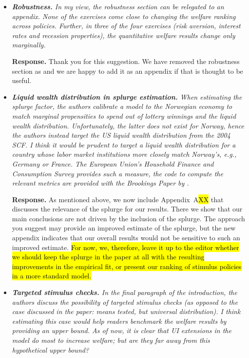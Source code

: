 \documentclass[12pt,letterpaper,english]{article}
\begin{document}
\begin{itemize}
	\item \textit{\textbf{Robustness.} In my view, the robustness section can be relegated to an appendix. None of the exercises come close to changing the welfare ranking across policies. Further, in three of the four exercises
		(risk aversion, interest rates and recession properties), the quantitative welfare results change only marginally.}
	
	\noindent \textbf{Response.} Thank you for this suggestion. We have removed the robustness section as and we are happy to add it as an appendix if that is thought to be useful.
	
	\item \textit{\textbf{Liquid wealth distribution in splurge estimation.} When estimating the splurge factor, the authors calibrate a model to the Norwegian economy to match marginal propensities to spend out of lottery winnings and the liquid wealth distribution. Unfortunately, the latter does not exist for Norway, hence the authors instead target the US liquid wealth distribution from the 2004 SCF. I think it would be prudent to target a liquid wealth distribution for a country whose labor market institutions more closely match Norway’s, e.g., Germany or France. The European Union’s Household Finance and Consumption Survey provides such a measure, the code to compute the relevant metrics are provided with the Brookings Paper by \citet{kaplan2014wealthy}.}
	
	\noindent \textbf{Response.} As mentioned above, we now include Appendix~A\hl{XX} that discusses the relevance of the splurge for our results. There we show that our main conclusions are not driven by the inclusion of the splurge. The approach you suggest may provide an improved estimate of the splurge, but the new appendix indicates that our overall results would not be sensitive to such an improved estimate. \hl{For now, we, therefore, leave it up to the editor whether we should keep the splurge in the paper at all with the resulting improvements in the empirical fit, or present our ranking of stimulus policies in a more standard model.}
	
	\item \textit{\textbf{Targeted stimulus checks.} In the final paragraph of the introduction, the authors discuss the possibility of targeted stimulus checks (as opposed to the case discussed in the paper: means tested, but universal distribution). I think estimating this case would help readers benchmark the welfare results by providing an upper bound. As of now, it is clear that UI extensions in the model do most to increase welfare; but are they far away from this hypothetical upper bound?}
	

\end{itemize}
\end{document}
